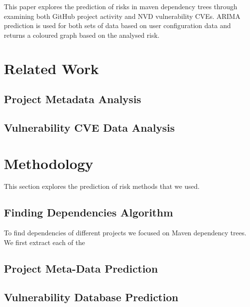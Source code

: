 \documentclass[10pt, onecolumn]{IEEEtran}
\begin{document}
This paper explores the prediction of risks in maven dependency trees through examining both GitHub project activity and NVD vulnerability CVEs. ARIMA prediction is used for both sets of data based on user configuration data and returns a coloured graph based on the analysed risk. 

\section{Related Work}

\subsection{Project Metadata Analysis}


\subsection{Vulnerability CVE Data Analysis}

\section{Methodology}
This section explores the prediction of risk methods that we used.

\subsection{Finding Dependencies Algorithm}
To find dependencies of different projects we focused on Maven dependency trees. We first extract each of the 

\subsection{Project Meta-Data Prediction}

\subsection{Vulnerability Database Prediction}
\end{document}
